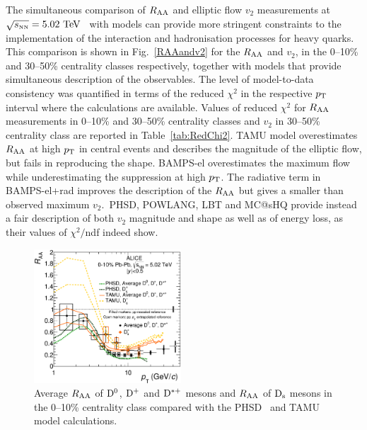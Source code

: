 The simultaneous comparison of $R_{\rm AA}$ and elliptic flow 
$v_2$ measurements at $\sqrt{s_{\rm \scriptscriptstyle NN}}=5.02~\mathrm{TeV}$~\cite{Acharya:2017qps} 
with models can provide more stringent constraints to the 
implementation of the interaction and hadronisation processes for heavy quarks. 
This comparison is shown in Fig.~\ref{RAAandv2} for the $R_{\rm AA}$  
and $v_2$, in the 0--10\% and 30--50\% centrality classes
 respectively, together with models that provide 
 simultaneous description of the observables.
The level of model-to-data consistency was quantified in
 terms of the reduced $\chi^2$ in the respective $p_{\rm T}$ interval 
 where the calculations are available.
Values of reduced $\chi^2$ for $R_{\rm AA}$ measurements in 
0--10\% and 30--50\% centrality classes and $v_2$ in 30--50\% 
centrality class are reported in Table~\ref{tab:RedChi2}.
TAMU model overestimates $R_{\rm AA}$ at high $p_{\rm T}$ in central 
events and describes the magnitude of the elliptic flow, 
but fails in reproducing the shape.
BAMPS-el overestimates the maximum flow while 
underestimating the suppression at high $p_{\rm T}$. The 
radiative term in BAMPS-el+rad improves the description 
of the $R_{\rm AA}$ but gives a smaller than observed maximum
 $v_2$.~PHSD, POWLANG, LBT and MC@sHQ provide
  instead a fair description of both $v_2$ magnitude and shape
as well as of energy loss, as their values of $\chi^2/$ndf indeed show. 
	\iffalse

\begin{figure}[!t]
 \begin{center}
\includegraphics[angle=0, width=0.49\textwidth]{FigCap5/DmesonAverageDs_010_Models_logx_.eps}
 \end{center}
 \caption{Average $R_{\rm AA}$ of ${\rm D^0}$, ${\rm D^+}$ and ${\rm D^{*+}}$ mesons and $R_{\rm AA}$ of ${\rm D_s}$ mesons in the 0--10\% centrality class compared with the PHSD~\cite{Song:2015ykw}  and TAMU~\cite{He:2014cla} model calculations.}
 \label{DandDsRaaWithModels} 
\end{figure} 


